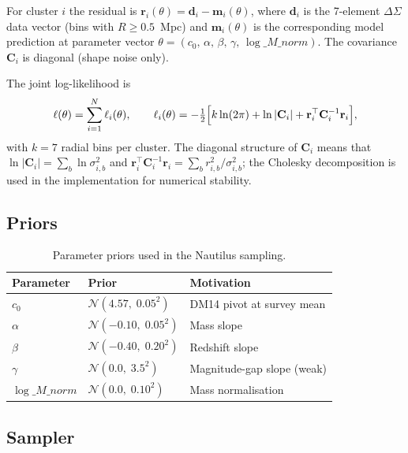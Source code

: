 \documentclass[11pt,a4paper]{article}
\begin{document}
For cluster $i$ the residual is
$\mathbf{r}_i(\theta) = \mathbf{d}_i - \mathbf{m}_i(\theta)$,
where $\mathbf{d}_i$ is the 7-element $\Delta\Sigma$ data vector (bins with
$R \geq 0.5$~Mpc) and $\mathbf{m}_i(\theta)$ is the corresponding model
prediction at parameter vector
$\theta = (c_0,\,\alpha,\,\beta,\,\gamma,\,\log\_M\_norm)$.
The covariance $\mathbf{C}_i$ is diagonal (shape noise only).

The joint log-likelihood is
\begin{equation}
  \ell(\theta) = \sum_{i=1}^{N} \ell_i(\theta),
  \qquad
  \ell_i(\theta) = -\tfrac{1}{2}\Bigl[
    k\ln(2\pi)
    + \ln|\mathbf{C}_i|
    + \mathbf{r}_i^\top \mathbf{C}_i^{-1} \mathbf{r}_i
  \Bigr],
  \label{eq:loglike}
\end{equation}
with $k = 7$ radial bins per cluster.  The diagonal structure of $\mathbf{C}_i$
means that $\ln|\mathbf{C}_i| = \sum_b \ln \sigma_{i,b}^2$ and
$\mathbf{r}_i^\top\mathbf{C}_i^{-1}\mathbf{r}_i = \sum_b r_{i,b}^2/\sigma_{i,b}^2$;
the Cholesky decomposition is used in the implementation for numerical stability.

\subsection{Priors}
\label{sec:priors}

\begin{table}[htbp]
  \centering
  \caption{Parameter priors used in the Nautilus sampling.}
  \label{tab:priors}
  \begin{tabular}{lll}
    \toprule
    Parameter & Prior & Motivation \\
    \midrule
    $c_0$ & $\mathcal{N}(4.57,\;0.05^2)$ & DM14 pivot at survey mean \\
    $\alpha$ & $\mathcal{N}(-0.10,\;0.05^2)$ & Mass slope \\
    $\beta$ & $\mathcal{N}(-0.40,\;0.20^2)$ & Redshift slope \\
    $\gamma$ & $\mathcal{N}(0.0,\;3.5^2)$ & Magnitude-gap slope (weak) \\
    $\log\_M\_norm$ & $\mathcal{N}(0.0,\;0.10^2)$ & Mass normalisation \\
    \bottomrule
  \end{tabular}
\end{table}

\subsection{Sampler}
\label{sec:sampler}
\end{document}
